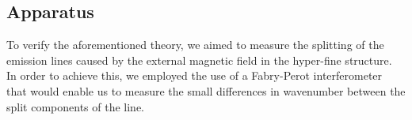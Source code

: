 \documentclass[11pt]{article}
\begin{document}

\subsection{Apparatus} \label{sec: aparatus}
To verify the aforementioned theory, we aimed to measure the splitting of the emission lines caused by the external magnetic field in the hyper-fine structure. In order to achieve this, we employed the use of a Fabry-Perot interferometer that would enable us to measure the small differences in wavenumber between the split components of the line. 

\end{document}
